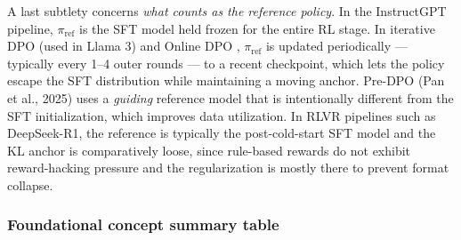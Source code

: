 \documentclass{article}
\begin{document}
A last subtlety concerns \emph{what counts as the reference policy}. In the InstructGPT pipeline, \(\pi_{\text{ref}}\) is the SFT model held frozen for the entire RL stage. In iterative DPO (used in Llama 3) and Online DPO \citep{qi20232023}, \(\pi_{\text{ref}}\) is updated periodically --- typically every 1--4 outer rounds --- to a recent checkpoint, which lets the policy escape the SFT distribution while maintaining a moving anchor. Pre-DPO (Pan et al., 2025) uses a \emph{guiding} reference model that is intentionally different from the SFT initialization, which improves data utilization. In RLVR pipelines such as DeepSeek-R1, the reference is typically the post-cold-start SFT model and the KL anchor is comparatively loose, since rule-based rewards do not exhibit reward-hacking pressure and the regularization is mostly there to prevent format collapse.

\subsubsection{Foundational concept summary table}\label{foundational-concept-summary-table}
\end{document}
